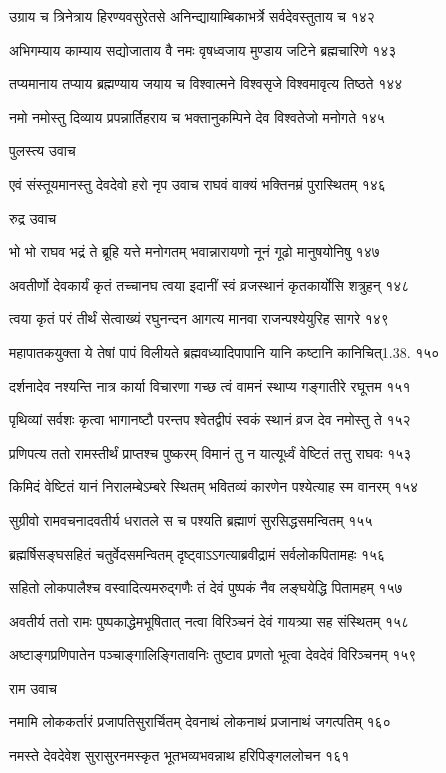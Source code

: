 उग्राय च त्रिनेत्राय हिरण्यवसुरेतसे
अनिन्द्यायाम्बिकाभर्त्रे सर्वदेवस्तुताय च १४२

अभिगम्याय काम्याय सद्योजाताय वै नमः
वृषध्वजाय मुण्डाय जटिने ब्रह्मचारिणे १४३

तप्यमानाय तप्याय ब्रह्मण्याय जयाय च
विश्वात्मने विश्वसृजे विश्वमावृत्य तिष्ठते १४४

नमो नमोस्तु दिव्याय प्रपन्नार्तिहराय च
भक्तानुकम्पिने देव विश्वतेजो मनोगते १४५

पुलस्त्य उवाच

एवं संस्तूयमानस्तु देवदेवो हरो नृप
उवाच राघवं वाक्यं भक्तिनम्रं पुरास्थितम् १४६

रुद्र उवाच

भो भो राघव भद्रं ते ब्रूहि यत्ते मनोगतम्
भवान्नारायणो नूनं गूढो मानुषयोनिषु १४७

अवतीर्णो देवकार्यं कृतं तच्चानघ त्वया
इदानीं स्वं व्रजस्थानं कृतकार्योसि शत्रुहन् १४८

त्वया कृतं परं तीर्थं सेत्वाख्यं रघुनन्दन
आगत्य मानवा राजन्पश्येयुरिह सागरे १४९

महापातकयुक्ता ये तेषां पापं विलीयते
ब्रह्मवध्यादिपापानि यानि कष्टानि कानिचित्1.38. १५०

दर्शनादेव नश्यन्ति नात्र कार्या विचारणा
गच्छ त्वं वामनं स्थाप्य गङ्गातीरे रघूत्तम १५१

पृथिव्यां सर्वशः कृत्वा भागानष्टौ परन्तप
श्वेतद्वीपं स्वकं स्थानं व्रज देव नमोस्तु ते १५२

प्रणिपत्य ततो रामस्तीर्थं प्राप्तश्च पुष्करम्
विमानं तु न यात्यूर्ध्वं वेष्टितं तत्तु राघवः १५३

किमिदं वेष्टितं यानं निरालम्बेऽम्बरे स्थितम्
भवितव्यं कारणेन पश्येत्याह स्म वानरम् १५४

सुग्रीवो रामवचनादवतीर्य धरातले
स च पश्यति ब्रह्माणं सुरसिद्धसमन्वितम् १५५

ब्रह्मर्षिसङ्घसहितं चतुर्वेदसमन्वितम्
दृष्ट्वाऽऽगत्याब्रवीद्रामं सर्वलोकपितामहः १५६

सहितो लोकपालैश्च वस्वादित्यमरुद्गणैः
तं देवं पुष्पकं नैव लङ्घयेद्धि पितामहम् १५७

अवतीर्य ततो रामः पुष्पकाद्धेमभूषितात्
नत्वा विरिञ्चनं देवं गायत्र्या सह संस्थितम् १५८

अष्टाङ्गप्रणिपातेन पञ्चाङ्गालिङ्गितावनिः
तुष्टाव प्रणतो भूत्वा देवदेवं विरिञ्चनम् १५९

राम उवाच

नमामि लोककर्तारं प्रजापतिसुरार्चितम्
देवनाथं लोकनाथं प्रजानाथं जगत्पतिम् १६०

नमस्ते देवदेवेश सुरासुरनमस्कृत
भूतभव्यभवन्नाथ हरिपिङ्गललोचन १६१


